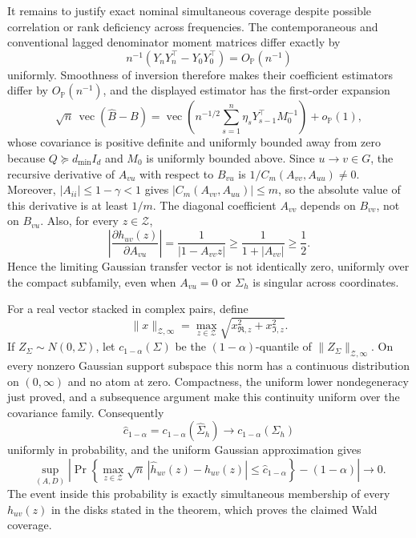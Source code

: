 It remains to justify exact nominal simultaneous coverage despite possible correlation or rank deficiency across frequencies.  The contemporaneous and conventional lagged denominator moment matrices differ exactly by
\[
 n^{-1}(Y_nY_n^\top-Y_0Y_0^\top)=O_{\mathbb P}(n^{-1})
\]
uniformly.  Smoothness of inversion therefore makes their coefficient estimators differ by \(O_{\mathbb P}(n^{-1})\), and the displayed estimator has the first-order expansion
\[
 \sqrt n\,\operatorname{vec}(\widehat B-B)
 =\operatorname{vec}\!\left(n^{-1/2}\sum_{s=1}^{n}\eta_sY_{s-1}^\top M_0^{-1}\right)+o_{\mathbb P}(1),
\]
whose covariance is positive definite and uniformly bounded away from zero because \(Q\succeq d_{\min}I_d\) and \(M_0\) is uniformly bounded above.  Since \(u\to v\in G\), the recursive derivative of \(A_{vu}\) with respect to \(B_{vu}\) is \(1/C_m(A_{vv},A_{uu})\ne0\).  Moreover, \(|A_{ii}|\le1-\gamma<1\) gives \(|C_m(A_{vv},A_{uu})|\le m\), so the absolute value of this derivative is at least \(1/m\).  The diagonal coefficient \(A_{vv}\) depends on \(B_{vv}\), not on \(B_{vu}\).  Also, for every \(z\in\mathcal Z\),
\[
 \left|\frac{\partial h_{uv}(z)}{\partial A_{vu}}\right|
 =\frac{1}{|1-A_{vv}z|}\ge\frac{1}{1+|A_{vv}|}\ge\frac12.
\]
Hence the limiting Gaussian transfer vector is not identically zero, uniformly over the compact subfamily, even when \(A_{vu}=0\) or \(\Sigma_h\) is singular across coordinates.

For a real vector stacked in complex pairs, define
\[
 \|x\|_{\mathcal Z,\infty}
 =\max_{z\in\mathcal Z}\sqrt{x_{\Re,z}^2+x_{\Im,z}^2}.
\]
If \(Z_{\Sigma}\sim N(0,\Sigma)\), let \(c_{1-\alpha}(\Sigma)\) be the \((1-\alpha)\)-quantile of \(\|Z_{\Sigma}\|_{\mathcal Z,\infty}\).  On every nonzero Gaussian support subspace this norm has a continuous distribution on \((0,\infty)\) and no atom at zero.  Compactness, the uniform lower nondegeneracy just proved, and a subsequence argument make this continuity uniform over the covariance family.  Consequently
\[
 \widehat c_{1-\alpha}=c_{1-\alpha}(\widehat\Sigma_h)
 \longrightarrow c_{1-\alpha}(\Sigma_h)
\]
uniformly in probability, and the uniform Gaussian approximation gives
\[
 \sup_{(A,D)}\left|
 \Pr\!\left\{
 \max_{z\in\mathcal Z}\sqrt n\,|\widehat h_{uv}(z)-h_{uv}(z)|
 \le\widehat c_{1-\alpha}
 \right\}-(1-\alpha)\right|\longrightarrow0.
\]
The event inside this probability is exactly simultaneous membership of every \(h_{uv}(z)\) in the disks stated in the theorem, which proves the claimed Wald coverage.
